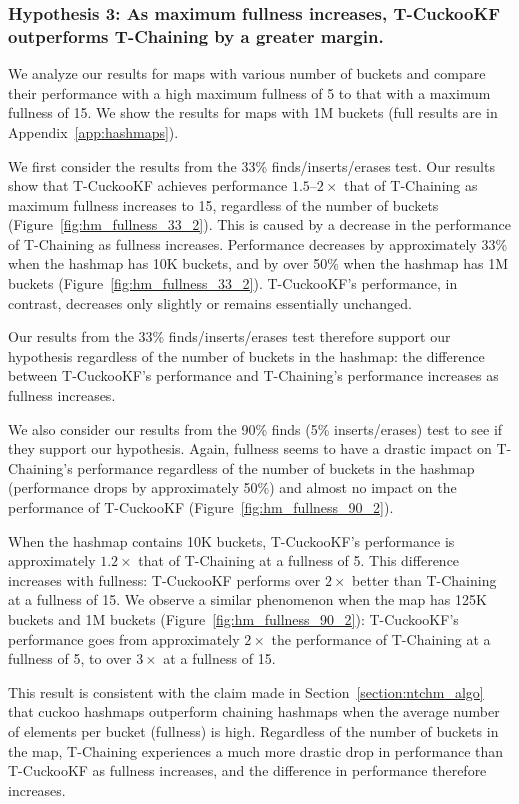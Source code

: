 \subsubsection{Hypothesis 3: As maximum fullness increases, T-CuckooKF outperforms T-Chaining by a greater margin.}

We analyze our results for maps with various number of buckets and compare their performance with a high maximum fullness of 5 to that with a maximum fullness of 15. We show the results for maps with 1M buckets (full results are in Appendix~\ref{app:hashmaps}).

We first consider the results from the 33\% finds/inserts/erases test. Our results show that T-CuckooKF achieves performance $1.5$--$2\times$ that of T-Chaining as maximum fullness increases to 15, regardless of the number of buckets (Figure~\ref{fig:hm_fullness_33_2}). 
This is caused by a decrease in the performance of T-Chaining as fullness increases. Performance decreases by approximately 33\% when the hashmap has 10K buckets, and by over 50\% when the hashmap has 1M buckets (Figure~\ref{fig:hm_fullness_33_2}). T-CuckooKF's performance, in contrast, decreases only slightly or remains essentially unchanged.

Our results from the 33\% finds/inserts/erases test therefore support our hypothesis regardless of the number of buckets in the hashmap: the difference between T-CuckooKF's performance and T-Chaining's performance increases as fullness increases. 

We also consider our results from the 90\% finds (5\% inserts/erases) test to see if they support our hypothesis.
Again, fullness seems to have a drastic impact on T-Chaining's performance regardless of the number of buckets in the hashmap (performance drops by approximately 50\%) and almost no impact on the performance of T-CuckooKF (Figure~\ref{fig:hm_fullness_90_2}). 

When the hashmap contains 10K buckets, T-CuckooKF's performance is approximately $1.2\times$ that of T-Chaining at a fullness of 5. This difference increases with fullness: T-CuckooKF performs over $2\times$ better than T-Chaining at a fullness of 15.
We observe a similar phenomenon when the map has 125K buckets and 1M buckets (Figure~\ref{fig:hm_fullness_90_2}): T-CuckooKF's performance goes from approximately $2\times$ the performance of T-Chaining at a fullness of 5, to over $3\times$ at a fullness of 15.
 
This result is consistent with the claim made in Section~\ref{section:ntchm_algo} that cuckoo hashmaps outperform chaining hashmaps when the average number of elements per bucket (fullness) is high.
Regardless of the number of buckets in the map, T-Chaining experiences a much more drastic drop in performance than T-CuckooKF as fullness increases, and the difference in performance therefore increases.

